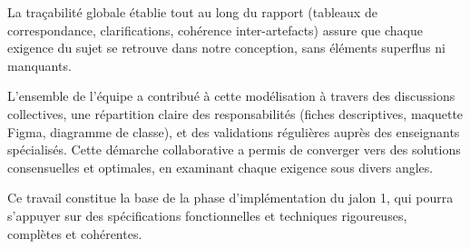 \documentclass{butexFR}
\begin{document}
La traçabilité globale établie tout au long du rapport (tableaux de correspondance, clarifications, cohérence inter-artefacts) assure que chaque exigence du sujet se retrouve dans notre conception, sans éléments superflus ni manquants.

L'ensemble de l'équipe a contribué à cette modélisation à travers des discussions collectives, une répartition claire des responsabilités (fiches descriptives, maquette Figma, diagramme de classe), et des validations régulières auprès des enseignants spécialisés. Cette démarche collaborative a permis de converger vers des solutions consensuelles et optimales, en examinant chaque exigence sous divers angles.

Ce travail constitue la base de la phase d'implémentation du jalon 1, qui pourra s'appuyer sur des spécifications fonctionnelles et techniques rigoureuses, complètes et cohérentes.

\merci
\end{document}
